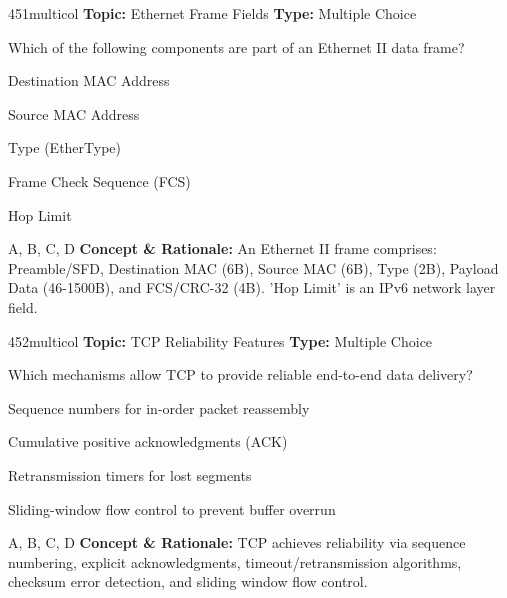 \begin{qcard}{451}{multicol}
\textcolor{darkslate!75}{\small\textbf{Topic:} Ethernet Frame Fields \hfill \textbf{Type:} Multiple Choice}\vspace{0.4em}\par
Which of the following components are part of an Ethernet II data frame?
\begin{qoptions}
\item Destination MAC Address
\item Source MAC Address
\item Type (EtherType)
\item Frame Check Sequence (FCS)
\item Hop Limit
\end{qoptions}
\end{qcard}
\nopagebreak
\begin{explainbox}{A, B, C, D}
\textbf{Concept \& Rationale:} An Ethernet II frame comprises: Preamble/SFD, Destination MAC (6B), Source MAC (6B), Type (2B), Payload Data (46-1500B), and FCS/CRC-32 (4B). 'Hop Limit' is an IPv6 network layer field.
\end{explainbox}

\begin{qcard}{452}{multicol}
\textcolor{darkslate!75}{\small\textbf{Topic:} TCP Reliability Features \hfill \textbf{Type:} Multiple Choice}\vspace{0.4em}\par
Which mechanisms allow TCP to provide reliable end-to-end data delivery?
\begin{qoptions}
\item Sequence numbers for in-order packet reassembly
\item Cumulative positive acknowledgments (ACK)
\item Retransmission timers for lost segments
\item Sliding-window flow control to prevent buffer overrun
\end{qoptions}
\end{qcard}
\nopagebreak
\begin{explainbox}{A, B, C, D}
\textbf{Concept \& Rationale:} TCP achieves reliability via sequence numbering, explicit acknowledgments, timeout/retransmission algorithms, checksum error detection, and sliding window flow control.
\end{explainbox}

